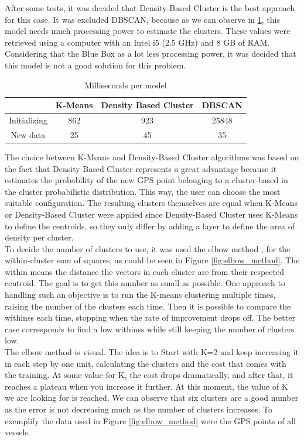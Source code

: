 After some tests, it was decided that Density-Based Cluster is the best approach for this case. It was excluded DBSCAN, because as we can observe in \ref{table:mill_per_moodle}, this model needs much processing power to estimate the clusters. These values were retrieved using a computer with an Intel i5 (2.5 GHz) and 8 GB of RAM. Considering that the Blue Box as a lot less processing power, it was decided that this model is not a good solution for this problem.
\\

\begin {table}[H]
\begin{center}
\begin{tabular}{c|c|c|c}
& \textbf{K-Means} & \textbf{Density Based Cluster} & \textbf{DBSCAN} \\
\hline
Initializing & 862 & 923 & 25848 \\

New data & 25 & 45 & 35 
\label{table:mill_per_moodle}
\end{tabular}
\caption {Milliseconds per model}
\end{center}
\end {table}

The choice between K-Means and Density-Based Cluster algorithms was based on the fact that Density-Based Cluster represents a great advantage because it estimates the probability of the new GPS point belonging to a cluster-based in the cluster probabilistic distribution. This way, the user can choose the most suitable configuration. The resulting clusters themselves are equal when K-Means or Density-Based Cluster were applied since Density-Based Cluster uses K-Means to define the centroids, so they only differ by adding a layer to define the area of density per cluster.
\\
To decide the number of clusters to use, it was used the elbow method \cite{Kodinariya2013ReviewOD}, for the within-cluster sum of squares, as could be seen in Figure \ref{fig:elbow_method}. The within means the distance the vectors in each cluster are from their respected centroid. The goal is to get this number as small as possible. One approach to handling such an objective is to run the K-means clustering multiple times, raising the number of the clusters each time. Then it is possible to compare the withinss each time, stopping when the rate of improvement drops off. The better case corresponds to find a low withinss while still keeping the number of clusters low.\\
The elbow method is visual. The idea is to Start with K=2 and keep increasing it in each step by one unit, calculating the clusters and the cost that comes with the training. At some value for K, the cost drops dramatically, and after that, it reaches a plateau when you increase it further. At this moment, the value of K we are looking for is reached. We can observe that six clusters are a good number as the error is not decreasing much as the number of clusters increases. To exemplify the data used in Figure \ref{fig:elbow_method} were the GPS points of all vessels.


